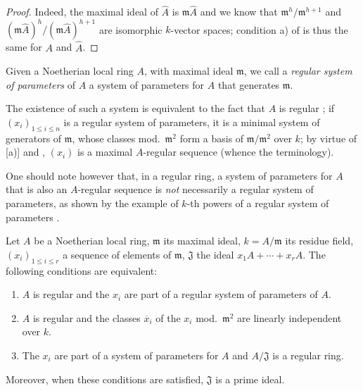 \begin{proof}
Indeed, the maximal ideal of $\widehat{A}$ is $\mathfrak{m}\widehat{A}$ and we know that $\mathfrak{m}^h/\mathfrak{m}^{h+1}$ and $(\mathfrak{m}\widehat{A})^h/(\mathfrak{m}\widehat{A})^{h+1}$ are isomorphic $k$-vector spaces;
condition a) of  is thus the same for $A$ and $\widehat{A}$.
\end{proof}

\begin{definition}[17.1.6]
\label{0.17.1.6}
Given a Noetherian local ring $A$, with maximal ideal $\mathfrak{m}$, we call a \emph{regular system of parameters} of $A$ a system of parameters for $A$  that generates $\mathfrak{m}$.
\end{definition}

The existence of such a system is equivalent to the fact that $A$ is regular ;
if $(x_i)_{1\leq i\leq n}$ is a regular system of parameters, it is a minimal system of generators of $\mathfrak{m}$, whose classes mod.~$\mathfrak{m}^2$ form a basis of $\mathfrak{m}/\mathfrak{m}^2$ over $k$;
by virtue of [a)] and , $(x_i)$ is a maximal $A$-regular sequence (whence the terminology).

One should note however that, in a regular ring, a system of parameters for $A$ that is also an $A$-regular sequence is \emph{not} necessarily a regular system of parameters, as shown by the example of $k$-th powers of a regular system of parameters .

\begin{proposition}[17.1.7]
\label{0.17.1.7}
Let $A$ be a Noetherian local ring, $\mathfrak{m}$ its maximal ideal, $k=A/\mathfrak{m}$ its residue field, $(x_i)_{1\leq i\leq r}$ a sequence of elements of $\mathfrak{m}$, $\mathfrak{J}$ the ideal $x_1 A+\cdots+x_r A$.
The following conditions are equivalent:
\begin{enumerate}
  \item[{\rm a)}] $A$ is regular and the $x_i$ are part of a regular system of parameters of $A$.
  \item[{\rm a')}] $A$ is regular and the classes $\overline{x}_i$ of the $x_i$ mod.~$\mathfrak{m}^2$ are linearly independent over $k$.
  \item[{\rm b)}] The $x_i$ are part of a system of parameters for $A$ and $A/\mathfrak{J}$ is a regular ring.
\end{enumerate}
Moreover, when these conditions are satisfied, $\mathfrak{J}$ is a prime ideal.
\end{proposition}

